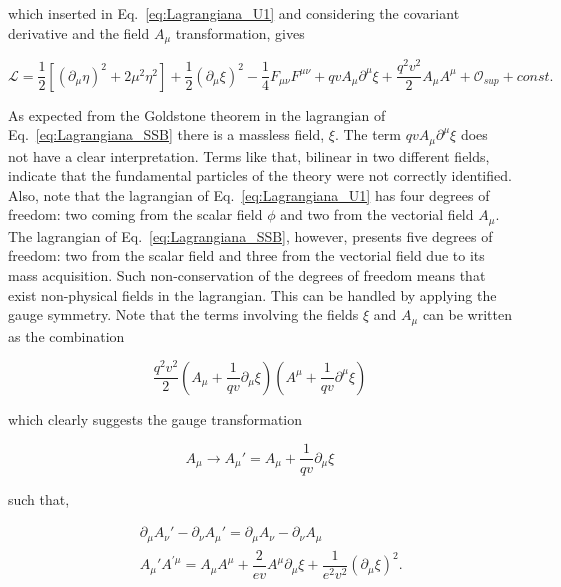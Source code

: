 which inserted in Eq.~\ref{eq:Lagrangiana_U1} and considering the covariant derivative and the field $A_{\mu}$ transformation, gives

\begin{equation}
\mathcal{L} = \dfrac{1}{2}[(\partial_{\mu}\eta)^2 + 2\mu^2\eta^2] + \dfrac{1}{2}(\partial_{\mu}\xi)^2 - \dfrac{1}{4}F_{\mu\nu}F^{\mu\nu} + qvA_{\mu}\partial^{\mu}\xi + \dfrac{q^2v^2}{2}A_{\mu}A^{\mu} + \mathcal{O}_{sup} + const.
\label{eq:Lagrangiana_SSB}
\end{equation} 

As expected from the Goldstone theorem in the lagrangian of Eq.~\ref{eq:Lagrangiana_SSB} there is a massless field, $\xi$. The term $qvA_{\mu}\partial^{\mu}\xi$ does not have a clear interpretation. Terms like that, bilinear in two different fields, indicate that the fundamental particles of the theory were not correctly identified. Also, note that the lagrangian of Eq.~\ref{eq:Lagrangiana_U1} has four degrees of freedom: two coming from the scalar field $\phi$ and two from the vectorial field $A_{\mu}$. The lagrangian of Eq.~\ref{eq:Lagrangiana_SSB}, however, presents five degrees of freedom: two from the scalar field and three from the vectorial field due to its mass acquisition. Such non-conservation of the degrees of freedom means that exist non-physical fields in the lagrangian. This can be handled by applying the gauge symmetry. Note that the terms involving the fields $\xi$ and $A_{\mu}$ can be written as the combination

\begin{equation}
\dfrac{q^2v^2}{2} \left( A_{\mu} + \dfrac{1}{qv}\partial_{\mu}\xi \right) \left( A^{\mu} + \dfrac{1}{qv}\partial^{\mu}\xi \right)
\end{equation}

which clearly suggests the gauge transformation

\begin{equation}
A_{\mu} \rightarrow A_{\mu}' = A_{\mu} + \dfrac{1}{qv}\partial_{\mu}\xi
\end{equation}

such that,

\begin{eqnarray}
&&\partial_{\mu}A_{\nu}' - \partial_{\nu}A_{\mu}'= \partial_{\mu}A_{\nu} - \partial_{\nu}A_{\mu}
\\ 
&&A_{\mu}'A^{'\mu} = A_{\mu}A^{\mu} + \dfrac{2}{ev}A^{\mu}\partial_{\mu}\xi + \dfrac{1}{e^2v^2}(\partial_{\mu}\xi)^2.
\end{eqnarray}

